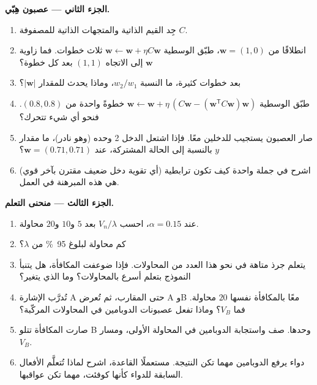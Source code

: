\begin{problem}
\medskip
\noindent\textbf{الجزء الثاني --- عصبون هِبّي.}
\begin{enumerate}[resume]
  \item جِد القيم الذاتية والمتجهات الذاتية للمصفوفة $C$.
  \item انطلاقًا من $\mathbf{w} = (1, 0)$، طبّق 
        الوسطية $\mathbf{w} \leftarrow \mathbf{w} + \eta C\mathbf{w}$
        ثلاث خطوات. فما زاوية $\mathbf{w}$ إلى الاتجاه $(1,1)$
        بعد كل خطوة؟
  \item بعد خطوات كثيرة، ما النسبة $w_{2}/w_{1}$، وماذا يحدث
        للمقدار $|\mathbf{w}|$؟
  \item طبّق  الوسطية $\mathbf{w} \leftarrow \mathbf{w} +
        \eta\,(C\mathbf{w} - (\mathbf{w}^{\mathsf{T}}C\mathbf{w})
        \mathbf{w})$ خطوةً واحدة من $(0.8, 0.8)$. فنحو أي شيء
        تتحرك؟
  \item صار العصبون يستجيب للدخلين معًا. فإذا اشتعل الدخل 2
        وحده (وهو نادر)، ما مقدار $y$ بالنسبة إلى الحالة
        المشتركة، عند $\mathbf{w} = (0.71, 0.71)$؟
  \item اشرح في جملة واحدة كيف تكون ترابطية  (أي تقوية دخل ضعيف مقترن بآخر قوي) هي هذه
        المبرهنة في العمل.
\end{enumerate}

\medskip
\noindent\textbf{الجزء الثالث --- منحنى التعلم.}
\begin{enumerate}[resume]
  \item عند $\alpha = 0.15$، احسب $V_{n}/\lambda$ بعد $5$ و$10$
        و$20$ محاولة.
  \item كم محاولة لبلوغ \qty{95}{\%} من $\lambda$؟
  \item يتعلم جرذ متاهة في نحو هذا العدد من المحاولات. فإذا
        ضوعفت المكافأة، هل يتنبأ النموذج بتعلم أسرع بالمحاولات؟
        وما الذي يتغير؟
  \item تُدرَّب الإشارة A حتى المقارب، ثم تُعرض A وB معًا
        بالمكافأة نفسها $20$ محاولة. فما $V_{B}$؟ وماذا تفعل
        عصبونات الدوبامين في المحاولات المركّبة؟
  \item صارت المكافأة تتلو B وحدها. صف  واستجابة
        الدوبامين في المحاولة الأولى، ومسار $V_{B}$.
  \item دواء يرفع الدوبامين مهما تكن النتيجة. مستعملًا
        القاعدة، اشرح لماذا تُتعلَّم الأفعال السابقة للدواء
        كأنها كوفئت، مهما تكن عواقبها.
\end{enumerate}


\end{problem}
